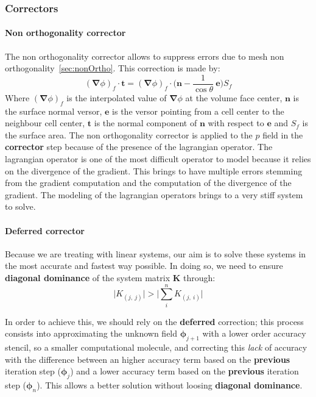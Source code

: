 \subsubsection{Correctors} \label{sec:CORR}


\paragraph{Non orthogonality corrector}
The non orthogonality corrector allows to suppress errors due to mesh non orthogonality~\ref{sec:nonOrtho}. This correction is made by:
\begin{equation}
    (\boldsymbol{\nabla} \phi)_{f} \cdot \boldsymbol{t} = (\boldsymbol{\nabla} \phi)_{f} \cdot \Big( \boldsymbol{n} - \frac{1}{\cos{\theta}} \ \boldsymbol{e} \Big) S_{f} 
    \label{eqn:nonOrtho}
\end{equation}
\noindent Where $(\boldsymbol{\nabla} \phi)_f$ is the interpolated value of $\boldsymbol{\nabla} \phi$ at the volume face center, $\boldsymbol{n}$ is the surface normal versor, $\boldsymbol{e}$ is the versor pointing from a cell center to the neighbour cell center, $\boldsymbol{t}$ is the normal component of $\boldsymbol{n}$ with respect to $\boldsymbol{e}$ and $S_f$ is the surface area. The non orthogonality corrector is applied to the $p$ field in the \textbf{corrector} step because of the presence of the lagrangian operator. The lagrangian operator is one of the most difficult operator to model because it relies on the divergence of the gradient. This brings to have multiple errors stemming from the gradient computation and the computation of the divergence of the gradient. The modeling of the lagrangian operators brings to a very stiff system to solve.

\paragraph{Deferred corrector}
Because we are treating with linear systems, our aim is to solve these systems in the most accurate and fastest way possible. In doing so, we need to ensure \textbf{diagonal dominance} of the system matrix $\boldsymbol{K}$ through:
\begin{equation}
    \big| K_{(j, \ j)} \big|  > \Bigg| \sum_i^n K_{(j, \ i)} \Bigg| 
    \label{eqn:diagDOM}
\end{equation}

\noindent In order to achieve this, we should rely on the \textbf{deferred} correction; this process consists into approximating the unknown field $\boldsymbol{\phi}_{j + 1}$ with a lower order accuracy stencil, so a smaller computational molecule, and correcting this \textit{lack} of accuracy with the difference between an higher accuracy term based on the \textbf{previous} iteration step ($\boldsymbol{\phi}_{j}$) and a lower accuracy term based on the \textbf{previous} iteration step ($\boldsymbol{\phi}_n$). This allows a better solution without loosing \textbf{diagonal dominance}. 

